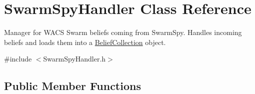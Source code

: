 \hypertarget{class_swarm_spy_handler}{
\section{SwarmSpyHandler Class Reference}
\label{class_swarm_spy_handler}
}


Manager for WACS Swarm beliefs coming from SwarmSpy. Handles incoming beliefs and loads them into a \hyperlink{class_belief_collection}{BeliefCollection} object.  




{\ttfamily \#include $<$SwarmSpyHandler.h$>$}

\subsection*{Public Member Functions}

